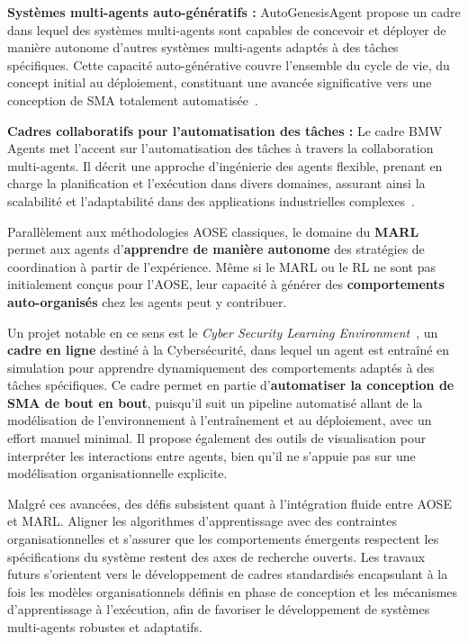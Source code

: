 \textbf{Systèmes multi-agents auto-génératifs :} AutoGenesisAgent propose un cadre dans lequel des systèmes multi-agents sont capables de concevoir et déployer de manière autonome d'autres systèmes multi-agents adaptés à des tâches spécifiques. Cette capacité auto-générative couvre l'ensemble du cycle de vie, du concept initial au déploiement, constituant une avancée significative vers une conception de SMA totalement automatisée~\cite{harper2024autogenesisagent}.

\textbf{Cadres collaboratifs pour l'automatisation des tâches :} Le cadre BMW Agents met l'accent sur l'automatisation des tâches à travers la collaboration multi-agents. Il décrit une approche d'ingénierie des agents flexible, prenant en charge la planification et l'exécution dans divers domaines, assurant ainsi la scalabilité et l'adaptabilité dans des applications industrielles complexes~\cite{crawford2024bmw}.

\vspace{0.5em}

Parallèlement aux méthodologies AOSE classiques, le domaine du \textbf{MARL} permet aux agents d'\textbf{apprendre de manière autonome} des stratégies de coordination à partir de l'expérience. Même si le MARL ou le RL ne sont pas initialement conçus pour l'AOSE, leur capacité à générer des \textbf{comportements auto-organisés} chez les agents peut y contribuer.

Un projet notable en ce sens est le \textit{Cyber Security Learning Environment}~\cite{hammar2023scalable}, un \textbf{cadre en ligne} destiné à la Cybersécurité, dans lequel un agent est entraîné en simulation pour apprendre dynamiquement des comportements adaptés à des tâches spécifiques. Ce cadre permet en partie d'\textbf{automatiser la conception de SMA de bout en bout}, puisqu'il suit un pipeline automatisé allant de la modélisation de l'environnement à l'entraînement et au déploiement, avec un effort manuel minimal. Il propose également des outils de visualisation pour interpréter les interactions entre agents, bien qu'il ne s'appuie pas sur une modélisation organisationnelle explicite.

Malgré ces avancées, des défis subsistent quant à l'intégration fluide entre AOSE et MARL. Aligner les algorithmes d'apprentissage avec des contraintes organisationnelles et s'assurer que les comportements émergents respectent les spécifications du système restent des axes de recherche ouverts. Les travaux futurs s'orientent vers le développement de cadres standardisés encapsulant à la fois les modèles organisationnels définis en phase de conception et les mécanismes d'apprentissage à l'exécution, afin de favoriser le développement de systèmes multi-agents robustes et adaptatifs.


